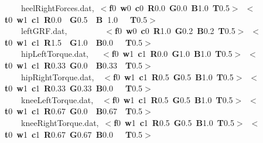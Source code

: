 \documentclass[singlecolumn,12pt]{article}
\newcommand{\hlstd}[1]{\textcolor[rgb]{0,0,0}{#1}}
\newcommand{\hlkey}[1]{\textcolor[rgb]{0,0,1}{\bf{#1}}}
\newcommand{\hlnum}[1]{\textcolor[rgb]{0.66,0,0.66}{#1}}
\begin{document}
\begin{landscape}
{\hlstd{\ \ \ \ }heelRightForces.dat,\ }\hlkey{$<$f}\hlnum{0\ }\hlkey{w}\hlnum{0\ }\hlkey{c}\hlnum{0\ }\hlkey{R}\hlnum{0.0\ }\hlkey{G}\hlnum{0.0\ }\hlkey{B}\hlnum{1.0\ }\hlkey{T}\hlnum{0.5}\hlkey{$>$}\hlstd{\ }\hlkey{$<$t}\hlnum{0\ }\hlkey{w}\hlnum{1\ }\hlkey{c}\hlnum{1\ }\hlkey{R}\hlnum{0.0\ \ }\hlkey{G}\hlnum{0.5\ \ }\hlkey{B\ }\hlnum{1.0\ \ \ }\hlkey{T}\hlnum{0.5}\hlkey{$>$}\hlstd{\\
\hlstd{\ \ \ \ }leftGRF.dat,\hlstd{\ \ \ \ \ \ \ \ \ }}\hlkey{$<$f}\hlnum{0\ }\hlkey{w}\hlnum{0\ }\hlkey{c}\hlnum{0\ }\hlkey{R}\hlnum{1.0\ }\hlkey{G}\hlnum{0.2\ }\hlkey{B}\hlnum{0.2\ }\hlkey{T}\hlnum{0.5}\hlkey{$>$}\hlstd{\ }\hlkey{$<$t}\hlnum{0\ }\hlkey{w}\hlnum{1\ }\hlkey{c}\hlnum{1\ }\hlkey{R}\hlnum{1.5\ \ }\hlkey{G}\hlnum{1.0\ \ }\hlkey{B}\hlnum{0.0\ \ \  }\hlkey{T}\hlnum{0.5}\hlkey{$>$}\hlstd{\\
\hlstd{\ \ \ \ }hipLeftTorque.dat,\hlstd{\ \ \ }}\hlkey{$<$f}\hlnum{0\ }\hlkey{w}\hlnum{1\ }\hlkey{c}\hlnum{1\ }\hlkey{R}\hlnum{0.0\ }\hlkey{G}\hlnum{1.0\ }\hlkey{B}\hlnum{1.0\ }\hlkey{T}\hlnum{0.5}\hlkey{$>$}\hlstd{\ }\hlkey{$<$t}\hlnum{0\ }\hlkey{w}\hlnum{1\ }\hlkey{c}\hlnum{1\ }\hlkey{R}\hlnum{0.33\ }\hlkey{G}\hlnum{0.0\hlstd{\ \ }}\hlkey{B}\hlnum{0.33\ \ }\hlkey{T}\hlnum{0.5}\hlkey{$>$}\hlstd{\\
\hlstd{\ \ \ \ }hipRightTorque.dat,\hlstd{\ \  }}\hlkey{$<$f}\hlnum{0\ }\hlkey{w}\hlnum{1\ }\hlkey{c}\hlnum{1\ }\hlkey{R}\hlnum{0.5\ }\hlkey{G}\hlnum{0.5\ }\hlkey{B}\hlnum{1.0\ }\hlkey{T}\hlnum{0.5}\hlkey{$>$}\hlstd{\ }\hlkey{$<$t}\hlnum{0\ }\hlkey{w}\hlnum{1\ }\hlkey{c}\hlnum{1\ }\hlkey{R}\hlnum{0.33\ }\hlkey{G}\hlnum{0.33\ }\hlkey{B}\hlnum{0.0\ \ \ }\hlkey{T}\hlnum{0.5}\hlkey{$>$}\hlstd{\\
\hlstd{\ \ \ \ }kneeLeftTorque.dat,\hlstd{\ \  }}\hlkey{$<$f}\hlnum{0\ }\hlkey{w}\hlnum{1\ }\hlkey{c}\hlnum{1\ }\hlkey{R}\hlnum{0.5\ }\hlkey{G}\hlnum{0.5\ }\hlkey{B}\hlnum{1.0\ }\hlkey{T}\hlnum{0.5}\hlkey{$>$}\hlstd{\ }\hlkey{$<$t}\hlnum{0\ }\hlkey{w}\hlnum{1\ }\hlkey{c}\hlnum{1\ }\hlkey{R}\hlnum{0.67\ }\hlkey{G}\hlnum{0.0\hlstd{\ \ }}\hlkey{B}\hlnum{0.67\ \  }\hlkey{T}\hlnum{0.5}\hlkey{$>$}\hlstd{\\
\hlstd{\ \ \ \ }kneeRightTorque.dat,\ }\hlkey{$<$f}\hlnum{0\ }\hlkey{w}\hlnum{1\ }\hlkey{c}\hlnum{1\ }\hlkey{R}\hlnum{0.5\ }\hlkey{G}\hlnum{0.5\ }\hlkey{B}\hlnum{1.0\ }\hlkey{T}\hlnum{0.5}\hlkey{$>$}\hlstd{\ }\hlkey{$<$t}\hlnum{0\ }\hlkey{w}\hlnum{1\ }\hlkey{c}\hlnum{1\ }\hlkey{R}\hlnum{0.67\ }\hlkey{G}\hlnum{0.67\ }\hlkey{B}\hlnum{0.0\ \ \ }\hlkey{T}\hlnum{0.5}\hlkey{$>$}\hlstd{\\
}
\end{landscape}
\end{document}
